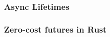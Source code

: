\begin{frame}[fragile]
    \frametitle{Async Lifetimes}
% 
% 
% 
% 
% 
% 
% 
% 
\end{frame}
\begin{frame}[fragile]
    \frametitle{Zero-cost futures in Rust}
% 
% 
% 
% 
% 
\end{frame}

